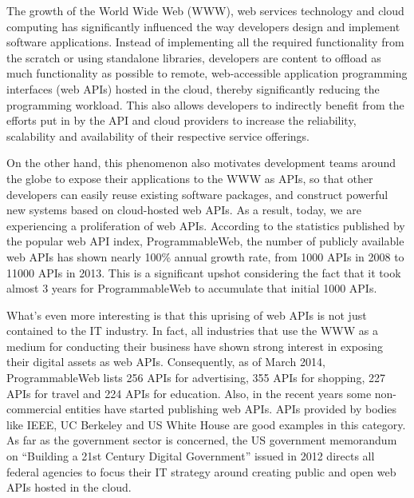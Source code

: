 The growth of the World Wide Web (WWW), web services technology and cloud computing has significantly influenced the
way developers design and implement software applications. Instead of implementing all the required functionality from
the scratch or using standalone libraries, developers are content to offload as much functionality as possible to remote,
web-accessible application programming interfaces (web APIs) hosted in the cloud, thereby significantly reducing the 
programming workload. This also allows developers to indirectly benefit from the efforts put in by the API and cloud providers to 
increase the reliability, scalability and availability of their respective service offerings. 

On the other hand, this phenomenon also motivates development teams around the globe to expose their applications to 
the WWW as APIs, so that other developers can easily reuse existing software packages, and construct powerful new systems 
based on cloud-hosted web APIs. As a result, today, we are experiencing a proliferation of web APIs. According to the 
statistics published by the popular web API index, ProgrammableWeb, the number of publicly available
web APIs has shown nearly 100\% annual growth rate, from 1000 APIs in 2008 to 11000 APIs in 2013. This is a significant upshot 
considering the fact that it took almost 3 years for ProgrammableWeb to accumulate that initial 1000 APIs. 

What's even more interesting is that this uprising 
of web APIs is not just contained to the IT industry. In fact, all industries that use the WWW as a medium for conducting their 
business have shown strong interest in exposing their digital assets as web APIs. Consequently, as of March 2014, ProgrammableWeb
lists 256 APIs for advertising, 355 APIs for shopping, 227 APIs for travel and 224 APIs for education. Also,
in the recent years some non-commercial entities have started publishing web APIs. APIs provided by bodies like IEEE, UC Berkeley and 
US White House are good examples in this category. As far as the government sector is concerned, the US government memorandum 
on ``Building a 21st Century Digital Government'' issued in 2012 directs all federal agencies to focus their IT strategy around creating
public and open web APIs hosted in the cloud.

